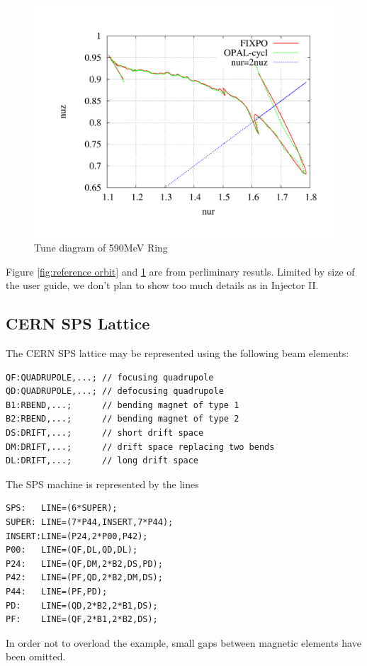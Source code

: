 \begin{figure}[ht]
  \begin{center} 
    \includegraphics[width=0.8\linewidth,angle=0]{figures/cyclotron/nurnuz_Ring}
    \caption{Tune diagram of 590MeV Ring}
    \label{fig:TuningRing}
  \end{center}
\end{figure}


Figure \ref{fig:reference orbit} and \ref{fig:TuningRing} are from perliminary resutls.
Limited by size of the user guide, we don't plan to show too much details as in Injector II.

\clearpage
\subsection{CERN SPS Lattice}
\label{sec:sps}
The CERN SPS lattice may be represented using the following beam elements:
\begin{verbatim}
QF:QUADRUPOLE,...; // focusing quadrupole
QD:QUADRUPOLE,...; // defocusing quadrupole
B1:RBEND,...;      // bending magnet of type 1
B2:RBEND,...;      // bending magnet of type 2
DS:DRIFT,...;      // short drift space
DM:DRIFT,...;      // drift space replacing two bends
DL:DRIFT,...;      // long drift space
\end{verbatim}
The SPS machine is represented by the lines
\begin{verbatim}
SPS:   LINE=(6*SUPER);
SUPER: LINE=(7*P44,INSERT,7*P44);
INSERT:LINE=(P24,2*P00,P42);
P00:   LINE=(QF,DL,QD,DL);
P24:   LINE=(QF,DM,2*B2,DS,PD);
P42:   LINE=(PF,QD,2*B2,DM,DS);
P44:   LINE=(PF,PD);
PD:    LINE=(QD,2*B2,2*B1,DS);
PF:    LINE=(QF,2*B1,2*B2,DS);
\end{verbatim}
In order not to overload the example,
small gaps between magnetic elements have been omitted.

